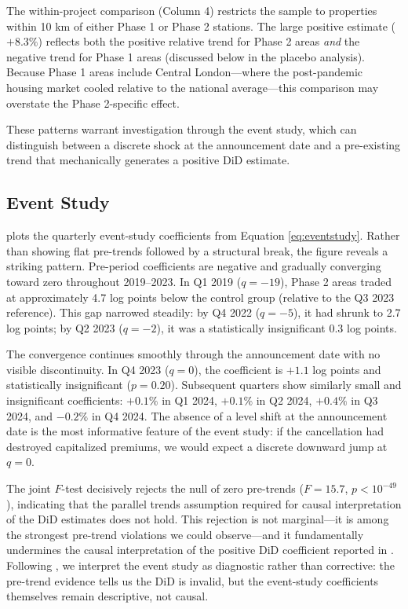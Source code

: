 \documentclass[12pt]{article}
\begin{document}
The within-project comparison (Column 4) restricts the sample to properties within 10 km of either Phase 1 or Phase 2 stations. The large positive estimate ($+8.3\%$) reflects both the positive relative trend for Phase 2 areas \textit{and} the negative trend for Phase 1 areas (discussed below in the placebo analysis). Because Phase 1 areas include Central London---where the post-pandemic housing market cooled relative to the national average---this comparison may overstate the Phase 2-specific effect.

These patterns warrant investigation through the event study, which can distinguish between a discrete shock at the announcement date and a pre-existing trend that mechanically generates a positive DiD estimate.

\subsection{Event Study}

 plots the quarterly event-study coefficients from Equation \ref{eq:eventstudy}. Rather than showing flat pre-trends followed by a structural break, the figure reveals a striking pattern. Pre-period coefficients are negative and gradually converging toward zero throughout 2019--2023. In Q1 2019 ($q = -19$), Phase 2 areas traded at approximately 4.7 log points below the control group (relative to the Q3 2023 reference). This gap narrowed steadily: by Q4 2022 ($q = -5$), it had shrunk to 2.7 log points; by Q2 2023 ($q = -2$), it was a statistically insignificant 0.3 log points.

The convergence continues smoothly through the announcement date with no visible discontinuity. In Q4 2023 ($q = 0$), the coefficient is $+1.1$ log points and statistically insignificant ($p = 0.20$). Subsequent quarters show similarly small and insignificant coefficients: $+0.1\%$ in Q1 2024, $+0.1\%$ in Q2 2024, $+0.4\%$ in Q3 2024, and $-0.2\%$ in Q4 2024. The absence of a level shift at the announcement date is the most informative feature of the event study: if the cancellation had destroyed capitalized premiums, we would expect a discrete downward jump at $q = 0$.

The joint $F$-test decisively rejects the null of zero pre-trends ($F = 15.7$, $p < 10^{-49}$), indicating that the parallel trends assumption required for causal interpretation of the DiD estimates does not hold. This rejection is not marginal---it is among the strongest pre-trend violations we could observe---and it fundamentally undermines the causal interpretation of the positive DiD coefficient reported in . Following \citet{roth2022pretest}, we interpret the event study as diagnostic rather than corrective: the pre-trend evidence tells us the DiD is invalid, but the event-study coefficients themselves remain descriptive, not causal.
\end{document}
